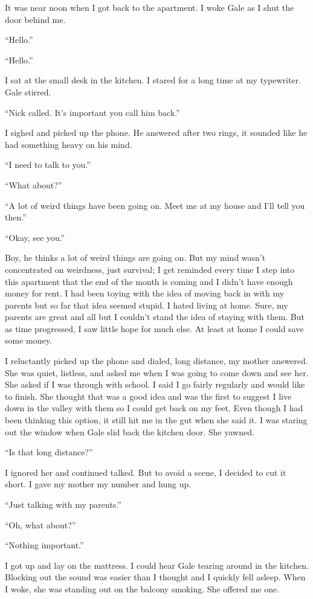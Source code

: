 It was near noon when I got back to the apartment. I woke Gale as I shut
the door behind me.

``Hello.''

``Hello.''

I sat at the small desk in the kitchen. I stared for a long time at my
typewriter. Gale stirred.

``Nick called. It's important you call him back.''

I sighed and picked up the phone. He answered after two rings, it
sounded like he had something heavy on his mind.

``I need to talk to you.''

``What about?''

``A lot of weird things have been going on. Meet me at my house and I'll
tell you then.''

``Okay, see you.''

Boy, he thinks a lot of weird things are going on. But my mind wasn't
concentrated on weirdness, just survival; I get reminded every time I
step into this apartment that the end of the month is coming and I
didn't have enough money for rent. I had been toying with the idea of
moving back in with my parents but so far that idea seemed stupid. I
hated living at home. Sure, my parents are great and all but I couldn't
stand the idea of staying with them. But as time progressed, I saw
little hope for much else. At least at home I could save some money.

I reluctantly picked up the phone and dialed, long distance, my mother
answered. She was quiet, listless, and asked me when I was going to come
down and see her. She asked if I was through with school. I said I go
fairly regularly and would like to finish. She thought that was a good
idea and was the first to suggest I live down in the valley with them so
I could get back on my feet. Even though I had been thinking this
option, it still hit me in the gut when she said it. I was staring out
the window when Gale slid back the kitchen door. She yawned.

``Is that long distance?''

I ignored her and continued talked. But to avoid a scene, I decided to
cut it short. I gave my mother my number and hung up.

``Just talking with my parents.''

``Oh, what about?''

``Nothing important.''

I got up and lay on the mattress. I could hear Gale tearing around in
the kitchen. Blocking out the sound was easier than I thought and I
quickly fell asleep. When I woke, she was standing out on the balcony
smoking. She offered me one.

